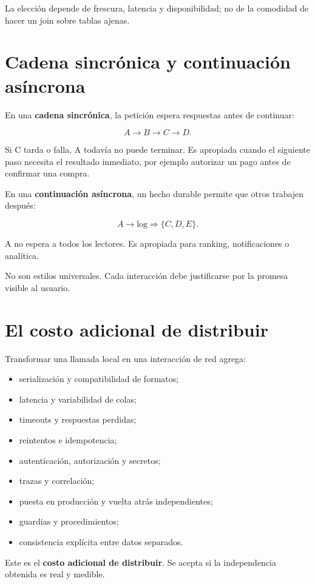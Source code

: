 \documentclass[variant=apuntes,cover=institutional,mode=screen]{ua-engineering-v6-article}
\begin{document}
La elección depende de frescura, latencia y disponibilidad; no de la comodidad de hacer un join sobre tablas ajenas.

\section{Cadena sincrónica y continuación asíncrona}

En una \textbf{cadena sincrónica}, la petición espera respuestas antes de continuar:

\[
A\rightarrow B\rightarrow C\rightarrow D.
\]

Si C tarda o falla, A todavía no puede terminar. Es apropiada cuando el siguiente paso necesita el resultado inmediato, por ejemplo autorizar un pago antes de confirmar una compra.

En una \textbf{continuación asíncrona}, un hecho durable permite que otros trabajen después:

\[
A\rightarrow \text{log}\Rightarrow \{C,D,E\}.
\]

A no espera a todos los lectores. Es apropiada para ranking, notificaciones o analítica.

No son estilos universales. Cada interacción debe justificarse por la promesa visible al usuario.

\section{El costo adicional de distribuir}

Transformar una llamada local en una interacción de red agrega:

\begin{itemize}
\item serialización y compatibilidad de formatos;
\item latencia y variabilidad de colas;
\item timeouts y respuestas perdidas;
\item reintentos e idempotencia;
\item autenticación, autorización y secretos;
\item trazas y correlación;
\item puesta en producción y vuelta atrás independientes;
\item guardias y procedimientos;
\item consistencia explícita entre datos separados.
\end{itemize}

Este es el \textbf{costo adicional de distribuir}. Se acepta si la independencia obtenida es real y medible.
\end{document}
